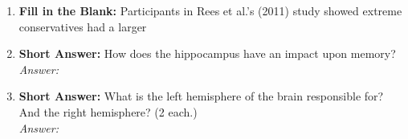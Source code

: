 \begin{enumerate}[label=\textbf{Q1.10.\arabic*}]
      \item \textbf{Fill in the Blank:} Participants in Rees et al.'s (2011) study showed extreme conservatives had a larger \underline{\hspace{3cm}} \\

      \item \textbf{Short Answer:} How does the hippocampus have an impact upon memory? \\
            \textit{Answer:} %

      \item \textbf{Short Answer:} What is the left hemisphere of the brain responsible for? And the right hemisphere? (2 each.) \\
            \textit{Answer:} \\%


\end{enumerate}
